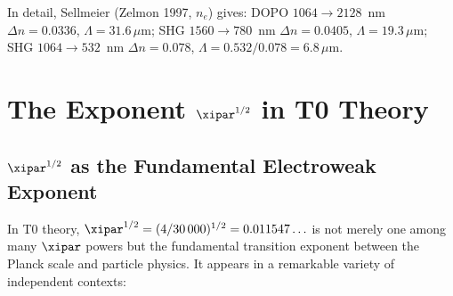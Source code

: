 \begin{table}[H]
    \centering
    \caption{Typical PPLN parameters for LiNbO$_3$ (extraordinary polarisation,
    room temperature, Sellmeier coefficients after Zelmon 1997).}
    \label{tab:ppln}
\end{table}
In detail, Sellmeier (Zelmon 1997, $n_e$) gives: DOPO $1064 \to 2128$~nm
$\Delta n = 0.0336$, $\Lambda = 31.6\,\mu$m; SHG $1560 \to 780$~nm $\Delta n = 0.0405$,
$\Lambda = 19.3\,\mu$m; SHG $1064 \to 532$~nm $\Delta n = 0.078$,
$\Lambda = 0.532/0.078 = 6.8\,\mu$m.

\clearpage

\section{The Exponent \texorpdfstring{$\xipar^{1/2}$}{xi\^{}(1/2)} in T0 Theory}
\label{sec:xi_half}

\subsection{%
  \texorpdfstring{$\xipar^{1/2}$}{xi\^{}(1/2)} as the Fundamental
  Electroweak Exponent}

In T0 theory, $\xipar^{1/2} = (4/30\,000)^{1/2} = 0.011547\ldots$ is not
merely one among many $\xipar$ powers but the fundamental transition exponent
between the Planck scale and particle physics. It appears in a remarkable
variety of independent contexts:

